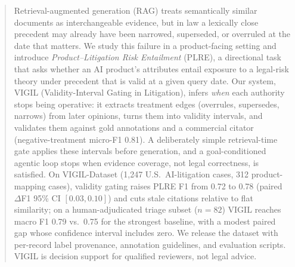 \begin{abstract}
Retrieval-augmented generation (RAG) treats semantically similar documents as interchangeable evidence, but in law a lexically close precedent may already have been narrowed, superseded, or overruled at the date that matters. We study this failure in a product-facing setting and introduce \emph{Product--Litigation Risk Entailment} (PLRE), a directional task that asks whether an AI product's attributes entail exposure to a legal-risk theory under precedent that is valid at a given query date. Our system, VIGIL (Validity-Interval Gating in Litigation), infers \emph{when} each authority stops being operative: it extracts treatment edges (overrules, supersedes, narrows) from later opinions, turns them into validity intervals, and validates them against gold annotations and a commercial citator (negative-treatment micro-F1 0.81). A deliberately simple retrieval-time gate applies these intervals before generation, and a goal-conditioned agentic loop stops when evidence coverage, not legal correctness, is satisfied. On VIGIL-Dataset (1{,}247 U.S.\ AI-litigation cases, 312 product-mapping cases), validity gating raises PLRE F1 from 0.72 to 0.78 (paired $\Delta$F1 95\% CI $[0.03,0.10]$) and cuts stale citations relative to flat similarity; on a human-adjudicated triage subset ($n{=}82$) VIGIL reaches macro F1 0.79 vs.\ 0.75 for the strongest baseline, with a modest paired gap whose confidence interval includes zero. We release the dataset with per-record label provenance, annotation guidelines, and evaluation scripts. VIGIL is decision support for qualified reviewers, not legal advice.
\end{abstract}

